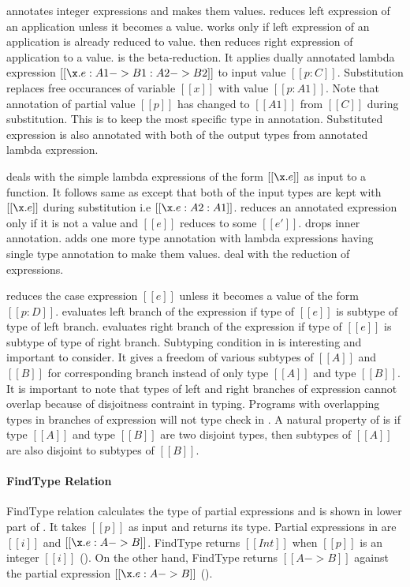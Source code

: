 annotates integer expressions and makes them values.  reduces left expression
of an application unless it becomes a value.  works only if left expression of an
application is already reduced to value.  then reduces right expression of
application to a value.
 is the beta-reduction. It applies dually annotated lambda expression
$[[\x.e : A1 -> B1 : A2 -> B2]]$ to input value $[[p:C]]$. Substitution replaces free occurances of variable
$[[x]]$ with value $[[p:A1]]$. Note that annotation of partial value $[[p]]$ has changed to $[[A1]]$ from
$[[C]]$ during substitution.
This is to keep the most specific type in annotation. Substituted expression is also
annotated with both of the output types from annotated lambda expression. 

 deals with the simple lambda expressions of the form $[[\x.e]]$ as input to a function.
It follows same as  except that both of the input types are kept with $[[\x.e]]$ during
substitution i.e $[[\x.e:A2:A1]]$.  reduces an annotated expression only if it is not a value
and $[[e]]$ reduces to some $[[e']]$.  drops inner annotation.  adds one
more type annotation with lambda expressions having single type annotation to make them values.
 deal with the reduction of \typeof expressions.

 reduces the case expression $[[e]]$ unless it becomes a value of the form $[[p:D]]$.
 evaluates left branch of the \typeof expression if type of $[[e]]$ is subtype
of type of left branch.
 evaluates right branch of the \typeof expression if type of $[[e]]$ is subtype
of type of right branch.
Subtyping condition in  is interesting and important to consider.
It gives a freedom of various subtypes of $[[A]]$ and $[[B]]$ for corresponding branch instead of only
type $[[A]]$ and type $[[B]]$.
It is important to note that types of left and right branches of \typeof expression cannot overlap
because of disjoitness contraint in typing. Programs with overlapping types in branches of \typeof
expression will not type check in \cal.
A natural property of \cal is if type $[[A]]$ and type $[[B]]$ are two
disjoint types, then subtypes of $[[A]]$ are also disjoint to subtypes of $[[B]]$.

\paragraph{FindType Relation} FindType relation calculates the type of partial expressions
and is shown in lower part of . It takes $[[p]]$ as input and returns its type.
Partial expressions in \cal are $[[i]]$ and $[[\x.e: A -> B]]$.
FindType returns $[[Int]]$ when $[[p]]$ is an integer $[[i]]$ (). On the other hand,
FindType returns $[[A -> B]]$ against the partial expression $[[\x.e : A->B]]$ ().

